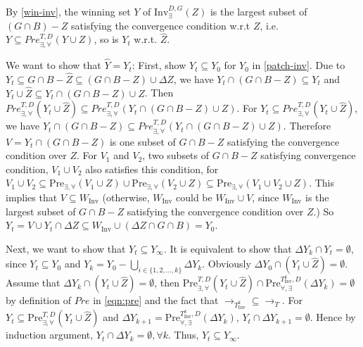 	By \eqref{win-inv}, the winning set $ Y $ of $ \text{Inv}_{\exists}^{D,G} (Z) $ is the largest subset of $ (G\cap B) - Z  $ satisfying the convergence condition w.r.t $ Z $, i.e. $ Y \subseteq Pre^{T,D}_{\exists, \forall}(Y\cup Z) $, so is $ Y_t $ w.r.t. $ \widehat{Z} $.
	
	We want to show that $ \widehat{Y} = Y_t$: First, show $ Y_t \subseteq Y_0 $ for $ Y_0 $ in \eqref{patch-inv}. Due to $ Y_t \subseteq G\cap B-\widehat{Z} \subseteq (G\cap B -Z)\cup \Delta Z $, we have $ Y_t\cap (G\cap B-Z)\subseteq Y_t $ and $ Y_t\cup \widehat{Z} \subseteq Y_t\cap (G\cap B-Z)\cup Z$. Then $ Pre^{T,D}_{\exists,\forall}(Y_t\cup \widehat{Z}) \subseteq Pre^{T,D}_{\exists,\forall}(Y_t\cap (G\cap B-Z)\cup Z)$. For $ Y_t \subseteq Pre^{T,D}_{\exists,\forall}(Y_t\cup \widehat{Z})$, we have $ Y_t\cap (G\cap B-Z)\subseteq Pre^{T,D}_{\exists,\forall}(Y_t\cap (G\cap B-Z)\cup Z) $. Therefore $ V= Y_t \cap (G\cap B -Z) $ is one subset of $ G\cap B -Z $ satisfying the convergence condition over $ Z $. For $ V_1 $ and $ V_2 $, two subsets of $ G\cap B-Z $ satisfying convergence condition, $ V_1\cup V_2 $ also satisfies this condition, for $ V_1\cup V_2\subseteq \text{Pre}_{\exists,\forall}(V_1\cup Z)\cup \text{Pre}_{\exists,\forall}(V_2\cup Z)\subseteq \text{Pre}_{\exists,\forall}(V_1\cup V_2\cup Z) $. This implies that $ V \subseteq W_{\text{Inv}} $ (otherwise, $ W_{\text{Inv}} $ could be $ W_{\text{Inv}}\cup V $, since $ W_{\text{Inv}} $ is the largest subset of $ G\cap B-Z $ satisfying the convergence condition over $ Z $.) So $ Y_t = V\cup Y_t\cap \Delta Z \subseteq W_{\text{Inv}}\cup (\Delta Z \cap G\cap B) = Y_0$. 
	
	Next, we want to show that $ Y_t \subseteq Y_{\infty} $. It is equivalent to show that $ \Delta Y_k\cap Y_t = \emptyset $, since $ Y_t\subseteq Y_0 $ and $ Y_k = Y_0 - \bigcup_{i\in \{1,2,...,k\}} \Delta Y_k$. Obviously $ \Delta Y_0\cap (Y_t\cup \widehat{Z}) = \emptyset $. Assume that $ \Delta Y_k \cap (Y_t\cup \widehat{Z}) = \emptyset $, then $ \text{Pre}_{\exists,\forall}^{T,D} (Y_t\cup \widehat{Z}) \cap \text{Pre}_{\forall, \exists}^{T_{\text{Inv}}^k,D}(\Delta Y_k) = \emptyset$ by definition of $ Pre $ in \eqref{eqn:pre} and the fact that $ \rightarrow_{T_{\text{Inv}}^k}\subseteq \rightarrow_{T} $. For $ Y_t \subseteq \text{Pre}_{\exists,\forall}^{T,D} (Y_t\cup \widehat{Z}) $ and $ \Delta Y_{k+1} = \text{Pre}_{\forall, \exists}^{T_{\text{Inv}}^k,D}(\Delta Y_k) $, $ Y_t\cap \Delta Y_{k+1} = \emptyset $. Hence by induction argument, $ Y_t \cap \Delta Y_k = \emptyset, \forall k $. Thus, $ Y_t\subseteq Y_{\infty} $. 
	
